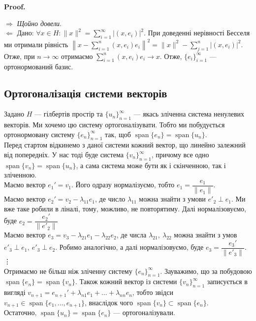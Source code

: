 \documentclass[a4paper, 10pt]{article}
\makeatletter
\def\rightproof{$\boxed{\Rightarrow}$ }
\def\leftproof{$\boxed{\Leftarrow}$ }
\theoremstyle{theoremdd}
\theoremstyle{theoremdd}
\theoremstyle{theoremdd}
\theoremstyle{theoremdd}
\theoremstyle{theoremdd}
\theoremstyle{theoremdd}
\theoremstyle{theoremdd}
\theoremstyle{theoremdd}
\renewenvironment{proof}[1][Proof.\\]{\par
\pushQED{\hfill \qed}%
\normalfont \topsep6\p@\@plus6\p@\relax
\trivlist
\item\relax
{\bfseries
#1\@addpunct{.}}\hspace\labelsep\ignorespaces
}{%
\popQED\endtrivlist\@endpefalse
}
\DeclareMathOperator{\linspan}{span}
\makeatother
\begin{document}
\begin{proof}
\rightproof \textit{Щойно довели}.
\bigskip \\
\leftproof Дано: $\forall x \in H: \|x\|^2 = \displaystyle\sum_{i=1}^\infty |(x,e_i)|^2$. При доведенні нерівності Бесселя ми отримали рівність $\displaystyle\left\| x - \sum_{i=1}^n (x,e_i)e_i \right\|^2 = \|x\|^2 - \sum_{j=1}^n |(x,e_i)|^2$. Отже, при $n \to \infty$ отримаємо $\displaystyle\sum_{i=1}^n (x,e_i)e_i \to x$. Отже, $\{e_i\}_{i=1}^\infty$ --- ортонормований базис.
\end{proof}

\subsection{Ортогоналізація системи векторів}
Задано $H$ --- гілбертів простір та $\{u_n\}_{n=1}^\infty$ --- якась зліченна система ненулевих векторів. Ми хочемо цю систему ортогоналізувати. Тобто ми побудується ортонормовану систему $\{e_n\}_{n=1}^\infty$ так, щоб $\linspan\{e_n\} = \linspan\{u_n\}$.\\
Перед стартом відкинемо з даної системи кожний вектор, що линейно залежний від попередніх. У нас тоді буде система $\{v_n\}_{n=1}^\infty$, причому все одно $\linspan\{v_n\} = \linspan\{u_n\}$, а сама система може бути як і скінченною, так і зліченною.\\
Маємо вектор $e_1' = v_1$. Його одразу нормалізуємо, тобто $e_1 = \dfrac{e_1}{\|e_1\|}$.\\
Маємо вектор $e_2' = v_2 - \lambda_{11} e_1$, де число $\lambda_{11}$ можна знайти з умови $e'_2 \perp e_1$. Ми вже таке робили в ліналі, тому, можливо, не повторятиму. Далі нормалізовуємо, буде $e_2 = \dfrac{e_2'}{\|e'_2\|}$\\
Маємо вектор $e_3 = v_3 - \lambda_{21}e_1 - \lambda_{22}e_2$, де числа $\lambda_{21},\ \lambda_{22}$ можна знайти з умов $e'_3 \perp e_1,\ e'_3 \perp e_2$. Робимо аналогічно, а далі нормалізовуємо, буде $e_3 = \dfrac{e_3'}{\|e'_3\|}$.
\vdots \\
Отримаємо не більш ніж зліченну систему $\{e_n\}_{n=1}^\infty$. Зауважимо, що за побудовою $\linspan\{e_n\} = \linspan\{v_n\}$. Також кожний вектор із системи $\{v_n\}_{n=1}^\infty$ записується в вигляді $v_{n+1} = e_{n+1}' + \lambda_{n1}e_1 + \dots + \lambda_{nn}e_n$, тобто звідси $v_{n+1} \in \linspan\{e_1,\dots,e_{n+1}\}$, внаслідок чого $\linspan\{v_n\} \subset \linspan\{e_n\}$.\\
Остаточно, $\linspan\{u_n\} = \linspan\{e_n\}$ --- ортогоналізували.
\end{document}
